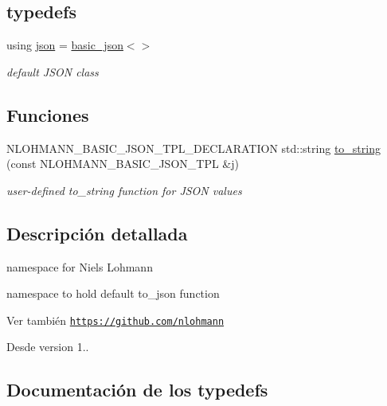 \subsection*{typedefs}
\begin{DoxyCompactItemize}
\item 
using \mbox{\hyperlink{namespacenlohmann_a2bfd99e845a2e5cd90aeaf1b1431f474}{json}} = \mbox{\hyperlink{classnlohmann_1_1basic__json}{basic\+\_\+json}}$<$$>$
\begin{DoxyCompactList}\small\item\em default J\+S\+ON class \end{DoxyCompactList}\end{DoxyCompactItemize}
\subsection*{Funciones}
\begin{DoxyCompactItemize}
\item 
N\+L\+O\+H\+M\+A\+N\+N\+\_\+\+B\+A\+S\+I\+C\+\_\+\+J\+S\+O\+N\+\_\+\+T\+P\+L\+\_\+\+D\+E\+C\+L\+A\+R\+A\+T\+I\+ON std\+::string \mbox{\hyperlink{namespacenlohmann_a6ce645a0b8717757e096a5b5773b7a16}{to\+\_\+string}} (const N\+L\+O\+H\+M\+A\+N\+N\+\_\+\+B\+A\+S\+I\+C\+\_\+\+J\+S\+O\+N\+\_\+\+T\+PL \&j)
\begin{DoxyCompactList}\small\item\em user-\/defined to\+\_\+string function for J\+S\+ON values \end{DoxyCompactList}\end{DoxyCompactItemize}


\subsection{Descripción detallada}
namespace for Niels Lohmann 

namespace to hold default {\ttfamily to\+\_\+json} function

\begin{DoxySeeAlso}{Ver también}
\href{https://github.com/nlohmann}{\tt https\+://github.\+com/nlohmann} 
\end{DoxySeeAlso}
\begin{DoxySince}{Desde}
version 1.. 
\end{DoxySince}


\subsection{Documentación de los \textquotesingle{}typedefs\textquotesingle{}}
\mbox{\label{namespacenlohmann_a2bfd99e845a2e5cd90aeaf1b1431f474}} 
